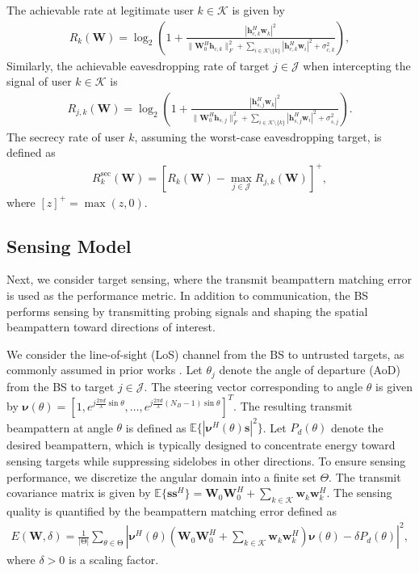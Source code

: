 \documentclass[runningheads]{llncs}
\begin{document}
The achievable rate at legitimate user $k \in \mathcal{K}$ is given by
\begin{align}
R_k(\mathbf{W}) = \log_2\left(1 + \frac{|\mathbf{h}_{c,k}^H \mathbf{w}_k|^2}
{\| \mathbf{W}_0^H \mathbf{h}_{c,k}\|^2_F
+ \sum_{i \in \mathcal{K} \setminus \{k\}} |\mathbf{h}_{c,k}^H \mathbf{w}_i|^2 
+ \sigma_{c,k}^2} \right),
\end{align}
Similarly, the achievable eavesdropping rate of target $j \in \mathcal{J}$ when intercepting the signal of user $k \in \mathcal{K}$ is
\begin{align}
R_{j,k}(\mathbf{W}) = \log_2\left(1 + \frac{|\mathbf{h}_{s,j}^H \mathbf{w}_k|^2}
{\|\mathbf{W}_0^H \mathbf{h}_{s,j}\|^2_F
+ \sum_{i \in \mathcal{K} \setminus \{k\}} |\mathbf{h}_{s,j}^H \mathbf{w}_i|^2 
+ \sigma_{s,j}^2} \right).
\end{align}
The secrecy rate of user $k$, assuming the worst-case eavesdropping target, is defined as
\begin{align}
R_k^{\mathrm{sec}}(\mathbf{W}) =
\left[
R_k(\mathbf{W}) - \max_{j \in \mathcal{J}} R_{j,k}(\mathbf{W})
\right]^+,
\end{align}
where $[z]^+ = \max(z,0)$.

\subsection{Sensing Model}
Next, we consider target sensing, where the transmit beampattern matching error is used as the performance metric. In addition to communication, the BS performs sensing by transmitting probing signals and shaping the spatial beampattern toward directions of interest. 

We consider the line-of-sight (LoS) channel from the BS to untrusted targets, as commonly assumed in prior works \cite{ren2023robust, hou2024optimal}. Let $\theta_j$ denote the angle of departure (AoD) from the BS to target $j \in \mathcal{J}$. The steering vector corresponding to angle $\theta$ is given by $\boldsymbol{\nu}(\theta) = 
\left[1, e^{j\frac{2\pi d}{\lambda}\sin\theta}, \dots, 
e^{j\frac{2\pi d}{\lambda}(N_B-1)\sin\theta} \right]^T$. The resulting transmit beampattern at angle $\theta$ is defined as $\mathbb{E} \{|\boldsymbol{\nu}^H (\theta) \mathbf{s}|^2\}$. 
Let $P_d(\theta)$ denote the desired beampattern, which is typically designed to concentrate energy toward sensing targets while suppressing sidelobes in other directions. To ensure sensing performance, we discretize the angular domain into a finite set $\Theta$.
The transmit covariance matrix is given by $\mathbb{E}\{\mathbf{s}\mathbf{s}^H\}
= \mathbf{W}_0 \mathbf{W}_0^H + \sum_{k \in \mathcal{K}} \mathbf{w}_k \mathbf{w}_k^H$. The sensing quality is quantified by the beampattern matching error defined as
\begin{align}
E(\mathbf{W}, \delta) = \frac{1}{|\mathrm{\Theta} |} \sum_{\theta \in \mathrm{\Theta}} 
\left| \boldsymbol{\nu}^H(\theta) \left( \mathbf{W}_0 \mathbf{W}_0^H + \sum_{k \in \mathcal{K}} \mathbf{w}_k \mathbf{w}_k^H \right) \boldsymbol{\nu}(\theta) - \delta P_d(\theta) \right|^2,
\end{align}
where $\delta > 0$ is a scaling factor.
 
\end{document}

